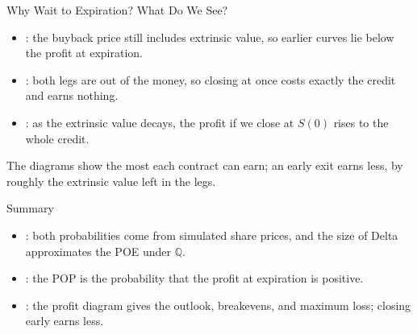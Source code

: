 \documentclass[aspectratio=169,11pt]{beamer}
\newcommand{\Q}{\mathbb{Q}}
\begin{document}
\begin{frame}{Why Wait to Expiration? What Do We See?}
  \begin{itemize}\setlength{\itemsep}{0.6em}
    \item {}: the buyback price still includes
      extrinsic value, so earlier curves lie below the profit at expiration.
    \item {}: both legs are out of the
      money, so closing at once costs exactly the credit and earns nothing.
    \item {}: as the extrinsic value decays, the profit if we
      close at $S(0)$ rises to the whole credit.
  \end{itemize}
  \vspace{0.4em}
  The diagrams show the most each contract can earn; an early exit earns less,
  by roughly the extrinsic value left in the legs.
\end{frame}

\begin{frame}{Summary}
  \vspace{0.3em}
  {\large\textbf{}}
  \begin{itemize}\setlength{\itemsep}{0.4em}
    \item {}: both probabilities come from simulated
      share prices, and the size of Delta approximates the POE under $\Q$.
    \item {}: the POP
      is the probability that the profit at expiration is positive.
    \item {}:
      the profit diagram gives the outlook, breakevens, and maximum loss; closing
      early earns less.
  \end{itemize}
\end{frame}
\end{document}
